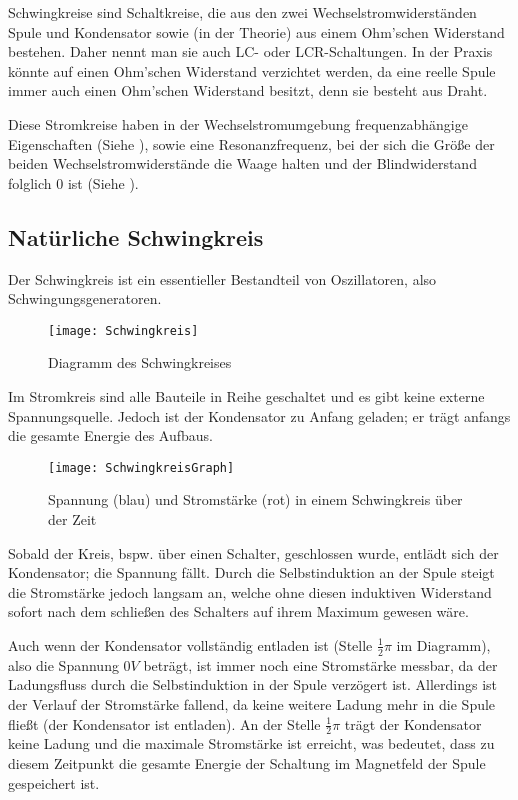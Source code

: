 Schwingkreise sind Schaltkreise, die aus den zwei Wechselstromwiderständen Spule und Kondensator sowie (in der Theorie) aus einem Ohm'schen Widerstand bestehen. Daher nennt man sie auch LC- oder LCR-Schaltungen. In der Praxis könnte auf einen Ohm'schen Widerstand verzichtet werden, da eine reelle Spule immer auch einen Ohm'schen Widerstand besitzt, denn sie besteht aus Draht. 

Diese Stromkreise haben in der Wechselstromumgebung frequenzabhängige Eigenschaften (Siehe ), sowie eine Resonanzfrequenz, bei der sich die Größe der beiden Wechselstromwiderstände die Waage halten und der Blindwiderstand folglich $0$ ist (Siehe ).

\subsection{Natürliche Schwingkreis}

Der Schwingkreis ist ein essentieller Bestandteil von Oszillatoren, also Schwingungsgeneratoren. 

\begin{figure}[h!]
	\centering
	\texttt{[image: Schwingkreis]}
	\caption{Diagramm des Schwingkreises}
\end{figure}

Im Stromkreis sind alle Bauteile in Reihe geschaltet und es gibt keine externe Spannungsquelle. Jedoch ist der Kondensator zu Anfang geladen; er trägt anfangs die gesamte Energie des Aufbaus.

\begin{figure}[h!]
	\centering
	\texttt{[image: SchwingkreisGraph]}
	\caption{Spannung (blau) und Stromstärke (rot) in einem Schwingkreis über der Zeit}
\end{figure}

Sobald der Kreis, bspw. über einen Schalter, geschlossen wurde, entlädt sich der Kondensator; die Spannung fällt. Durch die Selbstinduktion an der Spule steigt die Stromstärke jedoch langsam an, welche ohne diesen induktiven Widerstand sofort nach dem schließen des Schalters auf ihrem Maximum gewesen wäre.

Auch wenn der Kondensator vollständig entladen ist (Stelle $\frac{1}{2}\pi$ im Diagramm), also die Spannung $0V$ beträgt, ist immer noch eine Stromstärke messbar, da der Ladungsfluss durch die Selbstinduktion in der Spule verzögert ist. Allerdings ist der Verlauf der Stromstärke fallend, da keine weitere Ladung mehr in die Spule fließt (der Kondensator ist entladen). An der Stelle $\frac{1}{2}\pi$ trägt der Kondensator keine Ladung und die maximale Stromstärke ist erreicht, was bedeutet, dass zu diesem Zeitpunkt die gesamte Energie der Schaltung im Magnetfeld der Spule gespeichert ist.


